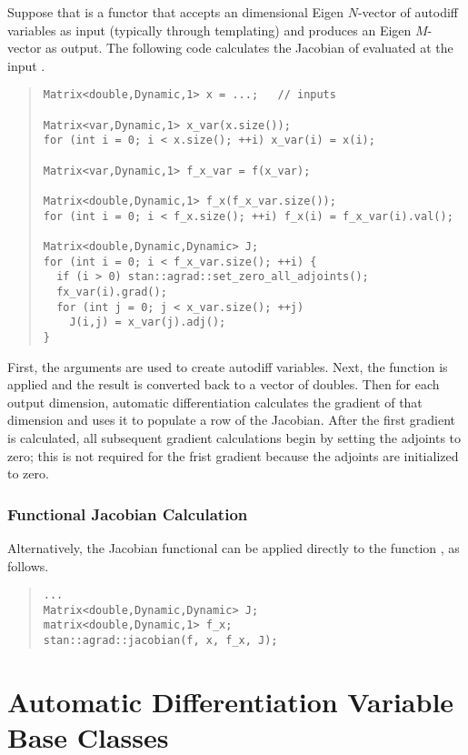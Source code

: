 \documentclass[10pt]{article}
\begin{document}
Suppose that  is a functor that accepts an dimensional Eigen
$N$-vector of autodiff variables as input (typically through
templating) and produces an Eigen $M$-vector as output.
The following code calculates the Jacobian of  evaluated 
at the input .

\begin{quote}
\begin{Verbatim}
Matrix<double,Dynamic,1> x = ...;   // inputs

Matrix<var,Dynamic,1> x_var(x.size());
for (int i = 0; i < x.size(); ++i) x_var(i) = x(i);

Matrix<var,Dynamic,1> f_x_var = f(x_var);

Matrix<double,Dynamic,1> f_x(f_x_var.size());
for (int i = 0; i < f_x.size(); ++i) f_x(i) = f_x_var(i).val();

Matrix<double,Dynamic,Dynamic> J;
for (int i = 0; i < f_x_var.size(); ++i) {
  if (i > 0) stan::agrad::set_zero_all_adjoints();
  fx_var(i).grad();
  for (int j = 0; j < x_var.size(); ++j)
    J(i,j) = x_var(j).adj();
}
\end{Verbatim}
\end{quote}
%
First, the arguments are used to create autodiff variables.  Next, the
function is applied and the result is converted back to a vector of
doubles.  Then for each output dimension, automatic differentiation
calculates the gradient of that dimension and uses it to populate a
row of the Jacobian.  After the first gradient is calculated, all
subsequent gradient calculations begin by setting the adjoints to
zero; this is not required for the frist gradient because the adjoints
are initialized to zero.


\subsubsection{Functional Jacobian Calculation}

Alternatively, the Jacobian functional can be applied directly to the
function , as follows.
%
\begin{quote}
\begin{Verbatim}
...
Matrix<double,Dynamic,Dynamic> J;
matrix<double,Dynamic,1> f_x;
stan::agrad::jacobian(f, x, f_x, J);
\end{Verbatim}
\end{quote}




\section{Automatic Differentiation Variable Base Classes}\label{autodiff-base-classes.section}
\end{document}
